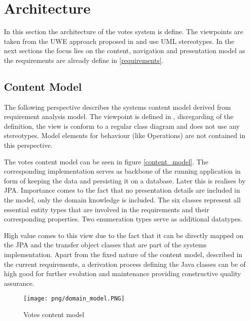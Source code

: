 \section{Architecture}

In this section the architecture of the votes system is define. The viewpoints are taken from the UWE approach proposed in \cite{Uwe08,uweref} and use UML stereotypes. In the next sections the focus lies on the content, navigation and presentation model as the requirements are already define in \ref{requirements}.



\subsection{Content Model}
The following perspective describes the systems content model derived from requirement analysis model. The viewpoint is defined in \cite{Uwe08,uweref}, disregarding of the definition, the view is conform to a regular class diagram and does not use any stereotypes. Model elements for behaviour (like Operations) are not contained in this perspective.

The votes content model can be seen in figure \ref{content_model}. The corresponding implementation serves as backbone of the running application in form of keeping the data and persisting it on a database. Later this is realises by JPA. Importance comes to the fact that no presentation details are included in the model, only the domain knowledge is included. The six classes represent all essential entity types that are involved in the requirements and their corresponding properties. Two enumeration types serve as additional datatypes. 

High value comes to this view due to the fact that it can be directly mapped on the JPA and the transfer object classes that are part of the systems implementation. Apart from the fixed nature of the content model, described in the current requirements, a derivation process defining the Java classes can be of high good for further evolution and maintenance providing constructive quality assurance.

\begin{figure}
\centering
\texttt{[image: png/domain\_model.PNG]}
\caption{Votes content model}
\label{F:content_model}
\end{figure}


